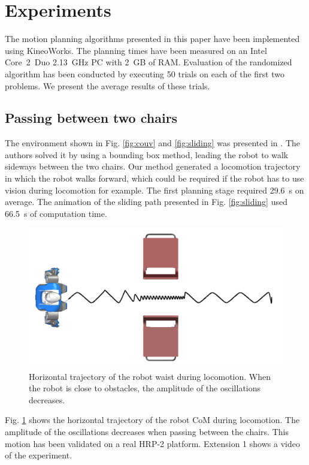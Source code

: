 \documentclass{article}
\begin{document}
\section{Experiments}

\label{sec:exp}

The motion planning algorithms presented in this paper have been implemented
using KineoWorks\texttrademark \cite{laumond2006kcs}. The planning times have been measured
on an Intel Core~2~Duo 2.13~GHz PC with 2~GB of RAM. Evaluation of the
randomized algorithm has been conducted by executing 50 trials on each
of the first two problems. We present the average results of these trials.


\subsection{Passing between two chairs}


The environment shown in Fig. \ref{fig:couv} and \ref{fig:sliding} was
presented in \cite{el2011path}. The  authors solved it by using a bounding
box method, leading the robot to walk sideways between the two chairs.
Our method generated a locomotion  trajectory in which the robot walks
forward, which could be required if the robot has to use vision during
locomotion for  example. The first planning stage  required 29.6~s
on  average.   The  animation  of   the  sliding  path   presented  in
Fig.   \ref{fig:sliding}    used   66.5~s  of  computation   time.


\begin{figure}[h!]
\centering
\includegraphics[width=0.7\linewidth]{pics/chairs/waist-trajectory.png}

\caption{Horizontal trajectory of the robot waist during
  locomotion. When the robot is close to obstacles, the amplitude of
  the oscillations decreases.}
\label{fig:chairs-waist}
\end{figure}



Fig.  \ref{fig:chairs-waist} shows  the horizontal  trajectory  of the
robot CoM  during  locomotion. The amplitude of the oscillations  decreases when passing
between the  chairs.  This motion has  been validated on  a real HRP-2
platform. Extension 1 shows a video of the experiment.
\end{document}
